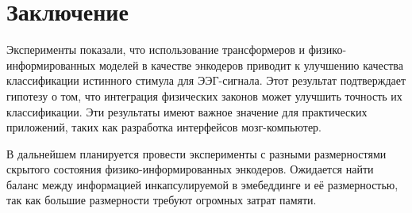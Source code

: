 \documentclass{article}
\begin{document}
\section{Заключение}
Эксперименты показали, что использование трансформеров и физико-информированных моделей в качестве энкодеров приводит к улучшению качества классификации истинного стимула для ЭЭГ-сигнала. Этот результат подтверждает гипотезу о том, что интеграция физических законов может улучшить точность их классификации. Эти результаты имеют важное значение для практических приложений, таких как разработка интерфейсов мозг-компьютер. 

В дальнейшем планируется провести эксперименты с разными размерностями скрытого состояния физико-информированных энкодеров. Ожидается найти баланс между информацией инкапсулируемой в эмебеддинге и её размерностью, так как большие размерности требуют огромных затрат памяти.



\end{document}
